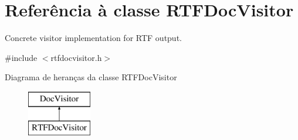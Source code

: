 \hypertarget{class_r_t_f_doc_visitor}{\section{Referência à classe R\-T\-F\-Doc\-Visitor}
\label{class_r_t_f_doc_visitor}
}


Concrete visitor implementation for R\-T\-F output.  




{\ttfamily \#include $<$rtfdocvisitor.\-h$>$}

Diagrama de heranças da classe R\-T\-F\-Doc\-Visitor\begin{figure}[H]
\begin{center}
\leavevmode
\includegraphics[height=2.000000cm]{class_r_t_f_doc_visitor}
\end{center}
\end{figure}
